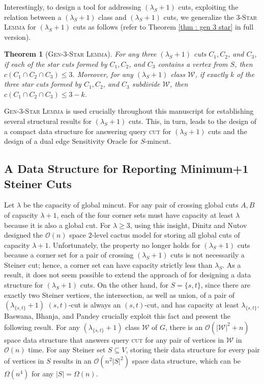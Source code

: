 \documentclass[letterpaper,11pt]{article}
\newtheorem{theorem}{Theorem}[]
\begin{document}
Interestingly, to design a tool for addressing $(\lambda_S+1)$ cuts, exploiting the relation between a $(\lambda_S+1)$ class and $(\lambda_S+1)$ cuts, we generalize the \textsc{3-Star Lemma} for $(\lambda_S+1)$ cuts as follows (refer to Theorem \ref{thm : gen 3 star} in full version). 
\begin{theorem}[\textsc{Gen-3-Star Lemma}] For any three $(\lambda_S+1)$ cuts $C_1,C_2$, and $C_3$, if each of the star cuts formed by $C_1,C_2$, and $C_3$ contains a vertex from $S$, then $c(C_1\cap C_2\cap C_3)\le 3$. Moreover, for any $(\lambda_S+1)$ class ${\mathcal W}$, if exactly $k$ of the three star cuts formed by $C_1,C_2$, and $C_3$ subdivide ${\mathcal W}$, then $c(C_1\cap C_2\cap C_3)\le 3-k$.
\end{theorem}




\noindent
\textsc{Gen-3-Star Lemma} is used crucially throughout this manuscript for establishing several structural results for $(\lambda_S+1)$ cuts. This, in turn, leads to the design of a compact data structure for answering query \textsc{cut} for $(\lambda_S+1)$ cuts and the design of a dual edge Sensitivity Oracle for $S$-mincut. 
\subsection{A Data Structure for Reporting Minimum+1 Steiner Cuts}
Let $\lambda$ be the capacity of global mincut. For any pair of crossing global cuts $A,B$ of capacity $\lambda+1$, each of the four corner sets must have capacity at least $\lambda$ because it is also a global cut. For $\lambda\ge 3$, using this insight, Dinitz and Nutov \cite{DBLP:conf/stoc/DinitzN95} designed the ${\mathcal O}(n)$ space $2$-level cactus model for storing all global cuts of capacity $\lambda+1$. 
Unfortunately, the property no longer holds for $(\lambda_S+1)$ cuts because a corner set for a pair of crossing $(\lambda_S+1)$ cuts is not necessarily a Steiner cut; hence, a corner set can have capacity strictly less than $\lambda_S$. As a result, it does not seem possible to extend the approach of \cite{DBLP:conf/stoc/DinitzN95} for designing a data structure for $(\lambda_S+1)$ cuts.
On the other hand,
for $S=\{s,t\}$, since there are exactly two Steiner vertices, the intersection, as well as union, of a pair of $(\lambda_{\{s,t\}}+1)$ $(s,t)$-cut is always an $(s,t)$-cut, and has capacity at least $\lambda_{\{s,t\}}$. Baswana, Bhanja, and Pandey \cite{DBLP:journals/talg/BaswanaBP23} crucially exploit this fact and present the following result. 
 For any $(\lambda_{\{s,t\}}+1)$ class ${\mathcal W}$ of $G$, there is an ${\mathcal O}(|{\mathcal W}|^2+n)$ space data structure that answers query \textsc{cut} for any pair of vertices in ${\mathcal W}$ in ${\mathcal O}(n)$ time. For any Steiner set $S\subseteq V$, storing their data structure for every pair of vertices in $S$ results in an ${\mathcal O}(n^2|S|^2)$ space data structure, which can be $\Omega(n^4)$ for any $|S|=\Omega(n)$.
\end{document}
